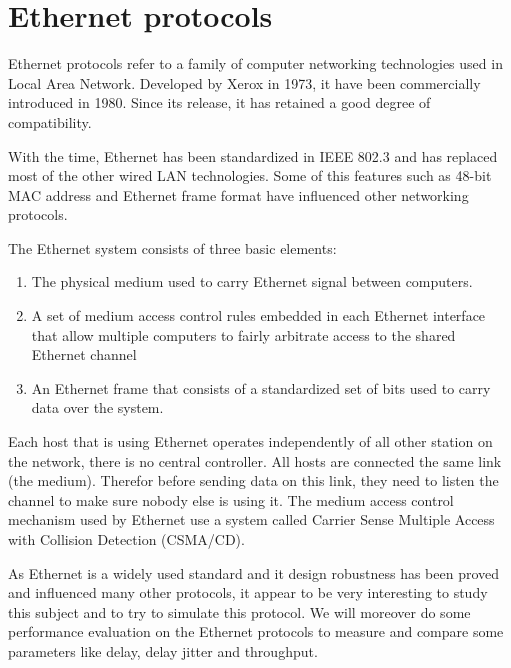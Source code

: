 \section{Ethernet protocols}

Ethernet protocols refer to a family of computer networking technologies
used in Local Area Network. Developed by Xerox in 1973, it have been
commercially introduced in 1980. Since its release, it has retained a
good degree of compatibility.

With the time, Ethernet has been standardized in IEEE 802.3 and has
replaced most of the other wired LAN technologies. Some of this features
such as 48-bit MAC address and Ethernet frame format have influenced
other networking protocols.

The Ethernet system consists of three basic elements:

\begin{enumerate}
    \item The physical medium used to carry Ethernet signal between
    computers.
    \item A set of medium access control rules embedded in each Ethernet
    interface that allow multiple computers to fairly arbitrate access
    to the shared Ethernet channel
    \item An  Ethernet frame that consists of a standardized set of bits
    used to carry data over the system.
\end{enumerate}

Each host that is using Ethernet operates independently of all other
station on the network, there is no central controller. All hosts are
connected the same link (the medium). Therefor before sending data
on this link, they need to listen the channel to make sure nobody else
is using it. The medium access control mechanism used by Ethernet use a
system called Carrier Sense Multiple Access with Collision Detection
(CSMA/CD).

As Ethernet is a widely used standard and it design robustness has been
proved and influenced many other protocols, it appear to be very
interesting to study this subject and to try to simulate this protocol.
We will moreover do some performance evaluation on the Ethernet
protocols to measure and compare some parameters like delay, delay
jitter and throughput.

